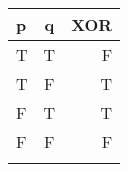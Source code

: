 
\begin{tabular}[b]{lcr}
    \toprule
    p & q & XOR \\
    \midrule
    T & T & F\\T & F & T\\F & T & T\\F & F & F\\
    \bottomrule
    \vspace{-0.1cm}
\end{tabular}